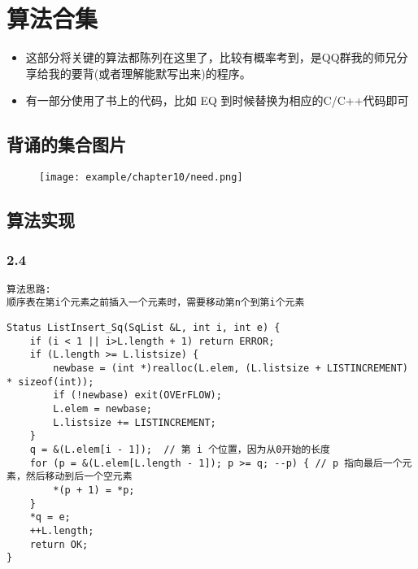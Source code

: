 
\chapter{算法合集}
\label{chap10}

\begin{itemize}[noitemsep,topsep=0pt,parsep=0pt,partopsep=0pt]
	\item 这部分将关键的算法都陈列在这里了，比较有概率考到，是QQ群我的师兄分享给我的要背(或者理解能默写出来)的程序。
	\item 有一部分使用了书上的代码，比如 EQ 到时候替换为相应的C/C++代码即可
\end{itemize}

\section{背诵的集合图片}
\begin{figure}[H]
	\centering  %
	\texttt{[image: example/chapter10/need.png]}
\end{figure}

\section{算法实现}

\subsection{2.4}
\begin{lstlisting}[basicstyle=\small\ttfamily, caption={}, numbers=none]
算法思路:
顺序表在第i个元素之前插入一个元素时，需要移动第n个到第i个元素
\end{lstlisting}
\begin{lstlisting}[basicstyle=\small\ttfamily, caption={}, numbers=none]
Status ListInsert_Sq(SqList &L, int i, int e) {
	if (i < 1 || i>L.length + 1) return ERROR;
	if (L.length >= L.listsize) {
		newbase = (int *)realloc(L.elem, (L.listsize + LISTINCREMENT) * sizeof(int));
		if (!newbase) exit(OVErFLOW);
		L.elem = newbase;
		L.listsize += LISTINCREMENT;
	}
	q = &(L.elem[i - 1]);  // 第 i 个位置，因为从0开始的长度
	for (p = &(L.elem[L.length - 1]); p >= q; --p) { // p 指向最后一个元素，然后移动到后一个空元素
		*(p + 1) = *p;
	}
	*q = e;
	++L.length;
	return OK;
}
\end{lstlisting}

